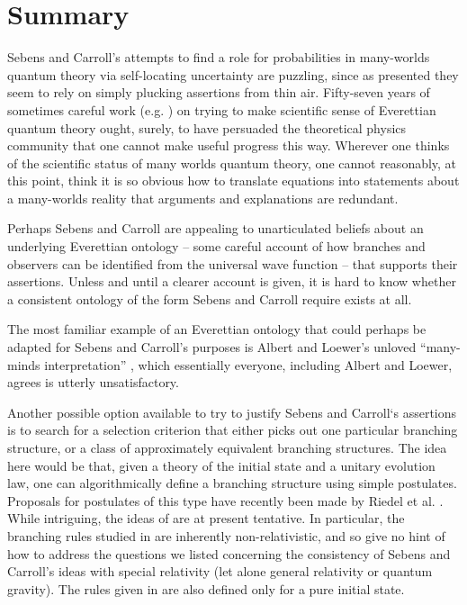 \documentclass[aps,prl,12pt]{revtex4}
\begin{document}
\section{Summary}

Sebens and Carroll's attempts \cite{cs1,cs2} to
find a role for probabilities in many-worlds quantum theory
via self-locating uncertainty are puzzling, since as presented  
they seem to rely on simply plucking assertions from thin air. 
Fifty-seven years of sometimes careful work 
(e.g. \cite{dewittmany,mwbook,geroch1984everett,deutsch1996comment,
gell1990quantum,hartle1991quantum,bell2004speakable,albert1988interpreting})
on trying to make
scientific sense of Everettian quantum theory ought, surely, 
to have persuaded the theoretical physics community
that one cannot make useful progress this way.  
Wherever one thinks of the scientific status of many worlds
quantum theory, one cannot reasonably, at this point, think
it is so obvious how to translate equations into statements about
a many-worlds reality that arguments and explanations are redundant.  

Perhaps Sebens and Carroll are appealing    
to unarticulated beliefs about an underlying Everettian ontology 
-- some careful account of how branches and observers can be 
identified from the universal wave function --
that supports their assertions.   Unless and until
a clearer account is given, it is hard to know whether
a consistent ontology of the form Sebens and Carroll require
exists at all.   

The most familiar
example of an Everettian ontology that could perhaps be adapted
for Sebens and Carroll's purposes is Albert and Loewer's unloved
``many-minds interpretation'' \cite{albert1988interpreting}, which
essentially everyone, including Albert and Loewer, agrees is 
utterly unsatisfactory.  

Another possible option available to try to justify Sebens and Carroll`s
assertions is to search for a selection criterion
that either picks out one particular branching structure, or
a class of approximately equivalent branching structures.
The idea here would be that, given a theory of the initial
state and a unitary evolution law, one can algorithmically
define a branching structure using simple postulates.
Proposals for postulates of this type have recently been
made by Riedel et al. \cite{Riedel:2013uoa}.   
While intriguing, the ideas of \cite{Riedel:2013uoa} are at present tentative.
In particular, the branching rules studied in
\cite{Riedel:2013uoa} are inherently non-relativistic, and so give
no hint of how to address the questions we listed concerning
the consistency of Sebens and Carroll's ideas with special
relativity (let alone general relativity or quantum gravity).
The rules given in \cite{Riedel:2013uoa} are also defined
only for a pure initial state. 
\end{document}

